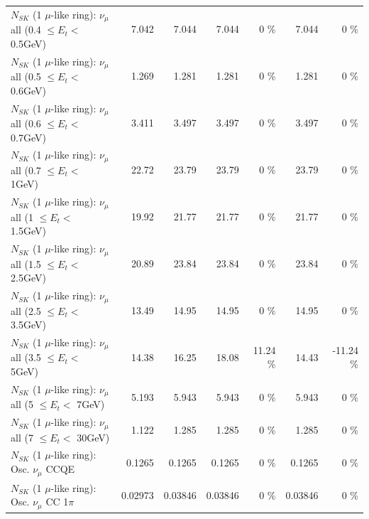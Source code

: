 \begin{table}
\begin{tabular}{| l | r | r | r  r | r  r |}
       $N_{SK}$ (1 $\mu$-like ring): $\nu_{\mu}$ all (0.4 $\leq E_{t} <$ 0.5GeV) &           7.042 &           7.044 &           7.044 &        0 \%  &           7.044 &        0 \%  \\ 
       $N_{SK}$ (1 $\mu$-like ring): $\nu_{\mu}$ all (0.5 $\leq E_{t} <$ 0.6GeV) &           1.269 &           1.281 &           1.281 &        0 \%  &           1.281 &        0 \%  \\ 
       $N_{SK}$ (1 $\mu$-like ring): $\nu_{\mu}$ all (0.6 $\leq E_{t} <$ 0.7GeV) &           3.411 &           3.497 &           3.497 &        0 \%  &           3.497 &        0 \%  \\ 
         $N_{SK}$ (1 $\mu$-like ring): $\nu_{\mu}$ all (0.7 $\leq E_{t} <$ 1GeV) &           22.72 &           23.79 &           23.79 &        0 \%  &           23.79 &        0 \%  \\ 
         $N_{SK}$ (1 $\mu$-like ring): $\nu_{\mu}$ all (1 $\leq E_{t} <$ 1.5GeV) &           19.92 &           21.77 &           21.77 &        0 \%  &           21.77 &        0 \%  \\ 
       $N_{SK}$ (1 $\mu$-like ring): $\nu_{\mu}$ all (1.5 $\leq E_{t} <$ 2.5GeV) &           20.89 &           23.84 &           23.84 &        0 \%  &           23.84 &        0 \%  \\ 
       $N_{SK}$ (1 $\mu$-like ring): $\nu_{\mu}$ all (2.5 $\leq E_{t} <$ 3.5GeV) &           13.49 &           14.95 &           14.95 &        0 \%  &           14.95 &        0 \%  \\ 
         $N_{SK}$ (1 $\mu$-like ring): $\nu_{\mu}$ all (3.5 $\leq E_{t} <$ 5GeV) &           14.38 &           16.25 &           18.08 &    11.24 \%  &           14.43 &   -11.24 \%  \\ 
           $N_{SK}$ (1 $\mu$-like ring): $\nu_{\mu}$ all (5 $\leq E_{t} <$ 7GeV) &           5.193 &           5.943 &           5.943 &        0 \%  &           5.943 &        0 \%  \\ 
          $N_{SK}$ (1 $\mu$-like ring): $\nu_{\mu}$ all (7 $\leq E_{t} <$ 30GeV) &           1.122 &           1.285 &           1.285 &        0 \%  &           1.285 &        0 \%  \\ 
\hline
\hline
                               $N_{SK}$ (1 $\mu$-like ring): Osc. $\nu_\mu$ CCQE &          0.1265 &          0.1265 &          0.1265 &        0 \%  &          0.1265 &        0 \%  \\ 
                          $N_{SK}$ (1 $\mu$-like ring): Osc. $\nu_\mu$ CC 1$\pi$ &         0.02973 &         0.03846 &         0.03846 &        0 \%  &         0.03846 &        0 \%  \\ 

\end{tabular}
\end{table}
